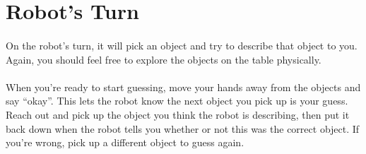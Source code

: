 \documentclass{article}
\begin{document}
\section {Robot's Turn}

\paragraph{} On the robot's turn, it will pick an object and try to describe that object to you. Again, you should feel free to explore the objects on the table physically.

\paragraph{} When you're ready to start guessing, move your hands away from the objects and say ``okay''. This lets the robot know the next object you pick up is your guess. Reach out and pick up the object you think the robot is describing, then put it back down when the robot tells you whether or not this was the correct object. If you're wrong, pick up a different object to guess again. 
\end{document}
